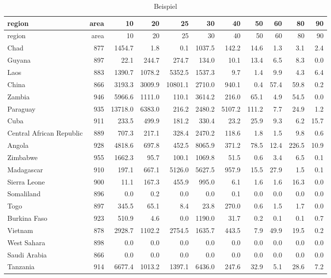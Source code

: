 	\begin{center}
	\begin{scriptsize}
		\begin{longtable}[ht]{lrrrrrrrrrr}
			\caption[Beispiel]{Beispiel} \label{tab:test}\\

			\hline
			region&area&10&20&25&30&40&50&60&80&90\\
			\hline
			\endfirsthead

			\hline
			region&area&10&20&25&30&40&50&60&80&90\\
			\hline
			\endhead

			\hline
			\endfoot

			Chad&877&1454.7&1.8&0.1&1037.5&142.2&14.6&1.3&3.1&2.4\\
			Guyana&897&22.1&244.7&274.7&134.0&10.1&13.4&6.5&8.3&0.0\\
			Laos&883&1390.7&1078.2&5352.5&1537.3&9.7&1.4&9.9&4.3&6.4\\
			China&866&3193.3&3009.9&10801.1&2710.0&940.1&0.4&57.4&59.8&0.2\\
			Zambia&946&5966.6&1111.0&110.1&3614.2&216.0&65.1&4.9&54.5&0.0\\
			Paraguay&935&13718.0&6383.0&216.2&2480.2&5107.2&111.2&7.7&24.9&1.2\\
			Cuba&911&233.5&499.9&181.2&330.4&23.2&25.9&9.3&6.2&15.7\\
			Central African Republic&889&707.3&217.1&328.4&2470.2&118.6&1.8&1.5&9.8&0.6\\
			Angola&928&4818.6&697.8&452.5&8065.9&371.2&78.5&12.4&226.5&10.9\\
			Zimbabwe&955&1662.3&95.7&100.1&1069.8&51.5&0.6&3.4&6.5&0.1\\
			Madagascar&910&197.1&667.1&5126.0&5627.5&957.9&15.5&27.9&1.5&0.1\\
			Sierra Leone&900&11.1&167.3&455.9&995.0&6.1&1.6&1.6&16.3&0.0\\
			Somaliland&896&0.0&0.2&0.0&0.0&0.1&0.0&0.0&0.0&0.0\\
			Togo&897&345.5&65.1&8.4&23.8&270.0&0.6&1.5&1.7&0.0\\
			Burkina Faso&923&510.9&4.6&0.0&1190.0&31.7&0.2&0.1&0.1&0.7\\
			Vietnam&878&2928.7&1102.2&2754.5&1635.7&443.5&7.9&49.9&19.5&0.2\\
			West Sahara&898&0.0&0.0&0.0&0.0&0.0&0.0&0.0&0.0&0.0\\
			Saudi Arabia&866&0.0&0.0&0.0&0.0&0.0&0.0&0.0&0.0&0.0\\
			Tanzania&914&6677.4&1013.2&1397.1&6436.0&247.6&32.9&5.1&28.6&7.2\\

\end{longtable}
\end{scriptsize}
\end{center}
